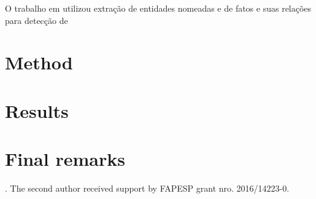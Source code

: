 \documentclass{llncs}
\begin{document}
	O trabalho em \cite{Sharonova201811} utilizou extração de entidades nomeadas e de fatos e suas relações para detecção de
	
	
	
	
	\section{Method}
	\label{sec.method}
	
	
	
	
	\section{Results}
	\label{sec.results}
	
	
	
	\section{Final remarks}
	\label{sec.remarks}
	
	
	. The second author received support by FAPESP grant nro. \mbox{2016/14223-0}.
	
	
	
	
	
	\begin{raggedright}
		
	\end{raggedright}
	
\end{document}

